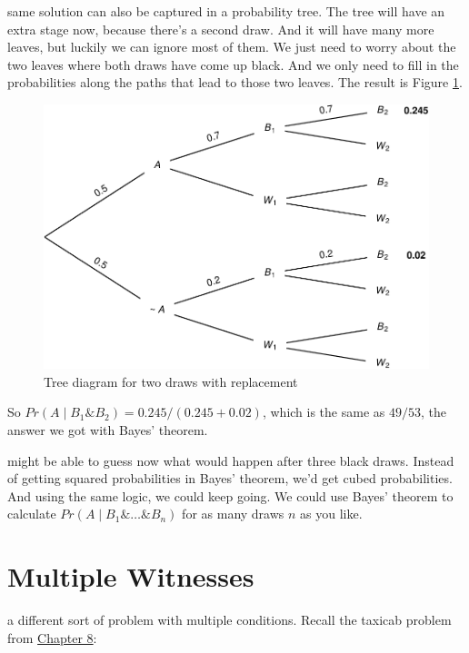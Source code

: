 \documentclass[justified]{tufte-book}
\newcommand{\given}{\mid}
\renewcommand{\wedge}{\mathbin{\&}}
\newcommand{\p}{Pr}
\theoremstyle{definition}
\theoremstyle{definition}
\theoremstyle{definition}
\theoremstyle{remark}
\begin{document}
 same solution can also be captured in a probability tree. The tree will have an extra stage now, because there's a second draw. And it will have many more leaves, but luckily we can ignore most of them. We just need to worry about the two leaves where both draws have come up black. And we only need to fill in the probabilities along the paths that lead to those two leaves. The result is Figure \ref{fig:twodrawsreplacement}.

\begin{figure}
\includegraphics{_main_files/figure-latex/twodrawsreplacement-1} \caption[Tree diagram for two draws with replacement]{Tree diagram for two draws with replacement}\label{fig:twodrawsreplacement}
\end{figure}

So \(\p(A \given B_1 \wedge B_2) = 0.245 / (0.245 + 0.02)\), which is the same as \(49/53\), the answer we got with Bayes' theorem.

 might be able to guess now what would happen after three black draws. Instead of getting squared probabilities in Bayes' theorem, we'd get cubed probabilities. And using the same logic, we could keep going. We could use Bayes' theorem to calculate \(\p(A \given B_1 \wedge \ldots \wedge B_n)\) for as many draws \(n\) as you like.

\hypertarget{multiple-witnesses}{%
\section{Multiple Witnesses}\label{multiple-witnesses}}

 a different sort of problem with multiple conditions. Recall the taxicab problem from \protect\hyperlink{chbayes}{Chapter 8}:
\end{document}
